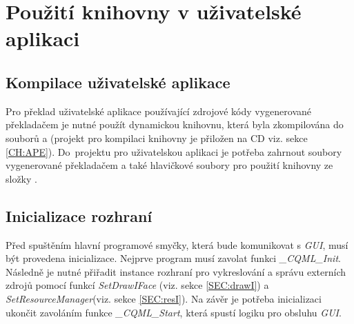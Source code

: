 \documentclass[11pt,twoside,a4paper]{book}
\begin{document}
\section[Použití knihovny]{Použití knihovny v uživatelské aplikaci}
\subsection{Kompilace uživatelské aplikace}
Pro překlad uživatelské aplikace používající zdrojové kódy vygenerované překladačem je nutné použít dynamickou knihovnu, která byla zkompilována do souborů  a  (projekt pro kompilaci knihovny je přiložen na CD viz. sekce \ref{CH:APE}). Do~projektu pro uživatelskou aplikaci je potřeba zahrnout soubory vygenerované překladačem a také hlavičkové soubory pro použití knihovny ze složky .
\subsection{Inicializace rozhraní}
Před spuštěním hlavní programové smyčky, která bude komunikovat s \textit{GUI}, musí být provedena inicializace. Nejprve program musí zavolat funkci \textit{\_CQML\_Init}. Následně je nutné přiřadit instance rozhraní pro vykreslování a správu externích zdrojů pomocí funkcí \textit{SetDrawIFace} (viz. sekce \ref{SEC:drawI}) a \textit{SetResourceManager}(viz. sekce \ref{SEC:resI}). Na závěr je potřeba inicializaci ukončit zavoláním funkce \textit{\_CQML\_Start}, která spustí logiku pro obsluhu \textit{GUI}.
\end{document}
